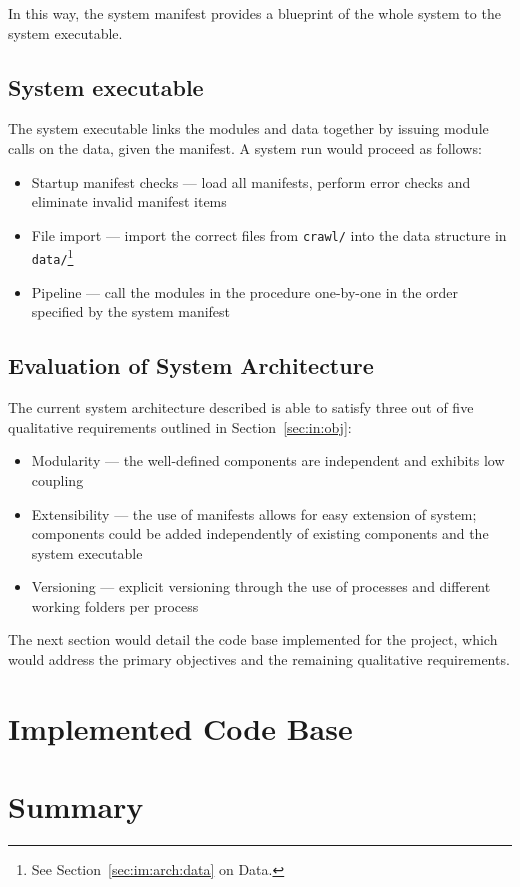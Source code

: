 In this way, the system manifest provides a blueprint of the whole system
to the system executable.

\subsection{System executable}

The system executable links the modules and data together by issuing module
calls on the data, given the manifest. A system run would proceed as follows:

\begin{itemize}
    \item Startup manifest checks --- load all manifests, perform error
    checks and eliminate invalid manifest items
    \item File import --- import the correct files from \texttt{crawl/}
    into the data structure in
    \texttt{data/}\footnote{See Section~\ref{sec:im:arch:data} on Data.}
    \item Pipeline --- call the modules in the procedure one-by-one in
    the order specified by the system manifest
\end{itemize}

\subsection{Evaluation of System Architecture}

The current system architecture described is able to satisfy three out of
five qualitative requirements outlined in Section~\ref{sec:in:obj}:

\begin{itemize}
    \item Modularity --- the well-defined components are independent and
    exhibits low coupling
    \item Extensibility --- the use of manifests allows for easy extension
    of system; components could be added independently of existing
    components and the system executable
    \item Versioning --- explicit versioning through the use of processes
    and different working folders per process
\end{itemize}

The next section would detail the code base implemented for the project,
which would address the primary objectives and the remaining qualitative
requirements.

\section{Implemented Code Base}\label{sec:im:code}

\section{Summary}\label{sec:im:summ}